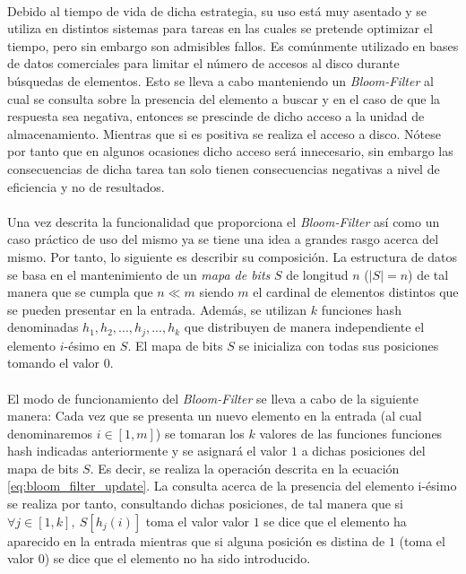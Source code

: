 \documentclass{subfiles}
\begin{document}
      \paragraph{}
      Debido al tiempo de vida de dicha estrategia, su uso está muy asentado y se utiliza en distintos sistemas para tareas en las cuales se pretende optimizar el tiempo, pero sin embargo son admisibles fallos. Es comúnmente utilizado en bases de datos comerciales para limitar el número de accesos al disco durante búsquedas de elementos. Esto se lleva a cabo manteniendo un \emph{Bloom-Filter} al cual se consulta sobre la presencia del elemento a buscar y en el caso de que la respuesta sea negativa, entonces se prescinde de dicho acceso a la unidad de almacenamiento. Mientras que si es positiva se realiza el acceso a disco. Nótese por tanto que en algunos ocasiones dicho acceso será innecesario, sin embargo las consecuencias de dicha tarea tan solo tienen consecuencias negativas a nivel de eficiencia y no de resultados.

      \paragraph{}
      Una vez descrita la funcionalidad que proporciona el \emph{Bloom-Filter} así como un caso práctico de uso del mismo ya se tiene una idea a grandes rasgo acerca del mismo. Por tanto, lo siguiente es describir su composición. La estructura de datos se basa en el mantenimiento de un \emph{mapa de bits} $S$ de longitud $n$ ($|S| = n$) de tal manera que se cumpla que $n \ll m$ siendo $m$ el cardinal de elementos distintos que se pueden presentar en la entrada. Además, se utilizan $k$ funciones hash denominadas $h_1, h_2,..., h_j,..., h_k$ que distribuyen de manera independiente el elemento $i$-ésimo en $S$. El mapa de bits $S$ se inicializa con todas sus posiciones tomando el valor $0$.

      \paragraph{}
      El modo de funcionamiento del \emph{Bloom-Filter} se lleva a cabo de la siguiente manera: Cada vez que se presenta un nuevo elemento en la entrada (al cual denominaremos $i \in [1, m]$) se tomaran los $k$ valores de las funciones funciones hash indicadas anteriormente y se asignará el valor $1$ a dichas posiciones del mapa de bits $S$. Es decir, se realiza la operación descrita en la ecuación \eqref{eq:bloom_filter_update}. La consulta acerca de la presencia del elemento i-ésimo se realiza por tanto, consultando dichas posiciones, de tal manera que si $\forall j \in [1,k], \ S[h_j(i)]$ toma el valor valor $1$ se dice que el elemento ha aparecido en la entrada mientras que si alguna posición es distina de $1$ (toma el valor $0$) se dice que el elemento no ha sido introducido.
\end{document}
